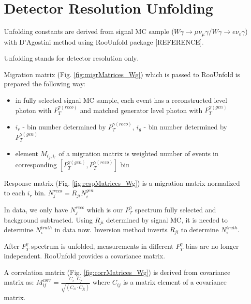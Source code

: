 \section{Detector Resolution Unfolding}
\label{sec:Unfolding}

Unfolding constants are derived from signal MC sample ($W\gamma\rightarrow\mu\nu_{\mu}\gamma$/$W\gamma\rightarrow{e}\nu_{e}\gamma$) with D'Agostini method using RooUnfold package [REFERENCE].

Unfolding stands for detector resolution only.

Migration matrix (Fig. \ref{fig:migrMatrices_Wg}) which is passed to RooUnfold is prepared the following way:
\begin{itemize}
  \item in fully selected signal MC sample, each event has a reconstructed level photon with $P_T^{\gamma(reco)}$ and matched generator level photon with $P_T^{\gamma(gen)}$
  \item $i_r$ - bin number determined by $P_T^{\gamma(reco)}$, $i_g$ - bin number determined by $P_T^{\gamma(gen)}$
  \item element $M_{i_g,i_r}$ of a migration matrix is weighted number of events in corresponding $[P_T^{\gamma(gen)},P_T^{\gamma(reco)}]$ bin
\end{itemize}

Response matrix (Fig. \ref{fig:respMatrices_Wg}) is a migration matrix normalized to each $i_r$ bin.
$N^{reco}_j = R_{ji} N^{gen}_i$

In data, we only have $N^{reco}_j$ which is our $P_T^{\gamma}$ spectrum fully selected and background subtracted. Using $R_{ji}$ determined by signal MC, it is needed to determine $N^{truth}_i$ in data now. Inversion method inverts $R_{ji}$ to determine $N^{truth}_i$.

After $P_T^{\gamma}$ spectrum is unfolded, measurements in different $P_T^{\gamma}$ bins are no longer independent. RooUnfold provides a covariance matrix.

A correlation matrix (Fig. \ref{fig:corrMatrices_Wg}) is derived from covariance matrix as:
$M^{corr}_{ij} = \frac{C_i \cdot C_j}{\sqrt{(C_{ii} \cdot C_{jj})}} $ where $C_{ij}$ is a matrix element of a covariance matrix.


